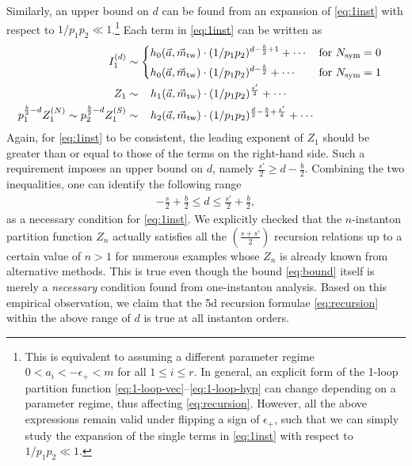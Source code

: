 \documentclass[letterpaper, 11pt]{article}
\def\e{\epsilon}
\begin{document}
{Similarly, an upper bound on $d$ can be found from an expansion of \eqref{eq:1inst} with respect to $ 1/p_1p_2 \ll 1$.\footnote{This is equivalent to assuming a different parameter regime $ 0 < a_i < -\e_+ < m$ for all $1\leq i \leq r$. In general, an explicit form of the 1-loop partition function \eqref{eq:1-loop-vec}--\eqref{eq:1-loop-hyp} can change depending on a parameter regime, thus affecting \eqref{eq:recursion}. However, all the above expressions remain valid under flipping a sign of $\epsilon_+$, such that we can simply study the expansion of the single terms in \eqref{eq:1inst} with respect to $ 1/p_1p_2 \ll 1$.} 
Each term in \eqref{eq:1inst} can be written as
\begin{align}
\begin{split}
  I_1^{(d)} &\sim \begin{dcases}
    h_0(\vec{a},  \vec{m}_{\text{tw}})\cdot  (1/p_1p_2)^{d-\frac{b}{2} + 1} + \cdots   &  \text{for }N_\text{sym} = 0\\
    h_0(\vec{a},  \vec{m}_{\text{tw}})\cdot (1/p_1p_2)^{d-\frac{b}{2} } + \cdots    &  \text{for }N_\text{sym} = 1
\end{dcases}
   \\
  Z_1 &\sim  \ \ \,  h_1(\vec{a},  \vec{m}_{\text{tw}})\cdot (1/p_1p_2)^{\frac{s'}{2}}  + \cdots   \\
  p_1^{\frac{b}{2}-d}Z_1^{(N)} \sim  p_2^{\frac{b}{2}-d}  Z^{(S)}_1&\sim \ \ \,  h_2(\vec{a},  \vec{m}_{\text{tw}})\cdot  (1/p_1p_2)^{\frac{d}{2}-\frac{b}{4}+\frac{s'}{4}}   + \cdots   
\end{split}
\end{align}
Again, for \eqref{eq:1inst} to be consistent, the leading exponent of $Z_1$ should be greater than or equal to those of the terms on the right-hand side. Such a requirement imposes an upper bound on $d$, namely  $\frac{s'}{2} \geq  d - \frac{b}{2}$.
Combining the two inequalities, one can identify the following range
\begin{align}
  \label{eq:bound}
  -\frac{s}{2} + \frac{b}{2} \leq d \leq \frac{s'}{2} + \frac{b}{2},
\end{align}
as a necessary condition for \eqref{eq:1inst}. 
We explicitly checked that the $n$-instanton partition function $Z_n$ actually satisfies all the $(\frac{s+s'}{2})$ recursion relations up to a certain value of $n > 1$ for numerous examples whose $Z_n$ is already known from alternative methods. 
This is true even though the bound \eqref{eq:bound} itself is merely a \emph{necessary} condition found from one-instanton analysis. 
Based on this empirical observation, we claim that the 5d recursion formulae \eqref{eq:recursion} within the above range of $d$ is true at all instanton orders.


}
\end{document}
